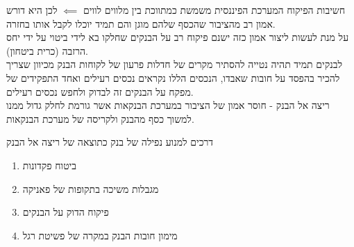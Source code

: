 \documentclass[usenames,dvipsnames]{beamer}
\begin{document}
\begin{RTL}
\begin{frame}[allowframebreaks]
    \framebreak
    \begin{block}{חשיבות הפיקוח}
        המערכת הפיננסית משמשת כמתווכת בין מלווים לווים $\impliedby$ לכן היא דורש אמון רב מהציבור שהכסף שלהם מוגן והם תמיד יוכלו לקבל אותו בחזרה.
        \newline
        \\
        על מנת לעשות ליצור אמון כזה ישנם פיקוח רב על הבנקים שחלקו בא לידי ביטוי על ידי יחס הרזבה (כרית ביטחון).
        \newline
        \\
        לבנקים תמיד תהיה נטייה להסתיר מקרים של חדלות פרעון של לקוחות הבנק מכיוון שצריך להכיר בהפסד על חובות שאבדו, הנכסים הללו נקראים נכסים רעילים ואחד התפקידים של מפקח על הבנקים זה לבדוק ולחפש נכסים רעילים.
        \newline
        \\
        ריצה אל הבנק - חוסר אמון של הציבור במערכת הבנקאות אשר גורמת לחלק גדול ממנו למשוך כסף מהבנק ולקריסה של מערכת הבנקאות.
    \end{block}


    \framebreak
    \begin{block}{דרכים למנוע נפילה של בנק כתוצאה של ריצה אל הבנק}
        \begin{enumerate}
            \item ביטוח פקדונות
            \item מגבלות משיכה בתקופות של פאניקה
            \item פיקוח הדוק על הבנקים
            \item מימון חובות הבנק במקרה של פשיטת רגל
        \end{enumerate}
    \end{block}
    

\end{frame}




\end{RTL}
\end{document}
